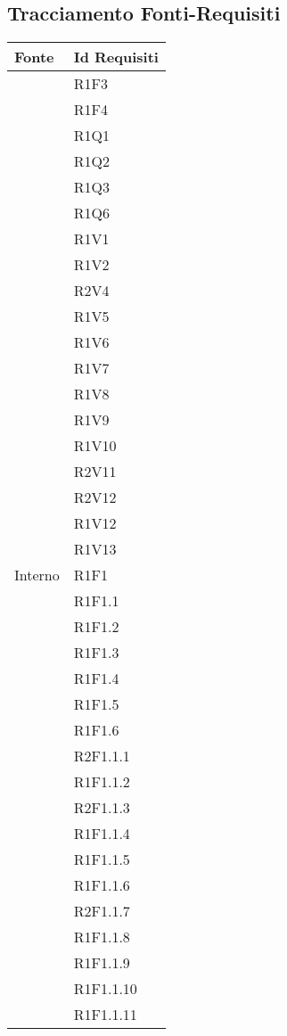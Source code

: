 \subsection{Tracciamento Fonti-Requisiti}
\normalsize
\begin{longtable}{|>{\centering}m{5cm}|m{5cm}<{\centering}|}
\hline 
\textbf{Fonte} & \textbf{Id Requisiti}\\
\hline
\endhead
{Capitolato}&{R1F3}\\
&{R1F4}\\
&{R1Q1}\\
&{R1Q2}\\
&{R1Q3}\\
&{R1Q6}\\
&{R1V1}\\
&{R1V2}\\
&{R2V4}\\
&{R1V5}\\
&{R1V6}\\
&{R1V7}\\
&{R1V8}\\
&{R1V9}\\
&{R1V10}\\
&{R2V11}\\
&{R2V12}\\
&{R1V12}\\
&{R1V13}\\ \hline
{Interno} & {R1F1}\\
&{R1F1.1}\\
&{R1F1.2}\\
&{R1F1.3}\\
&{R1F1.4}\\
&{R1F1.5}\\
&{R1F1.6}\\
&{R2F1.1.1}\\
&{R1F1.1.2}\\
&{R2F1.1.3}\\
&{R1F1.1.4}\\
&{R1F1.1.5}\\
&{R1F1.1.6}\\
&{R2F1.1.7}\\
&{R1F1.1.8}\\
&{R1F1.1.9}\\
&{R1F1.1.10}\\
&{R1F1.1.11}\\


\end{longtable}
